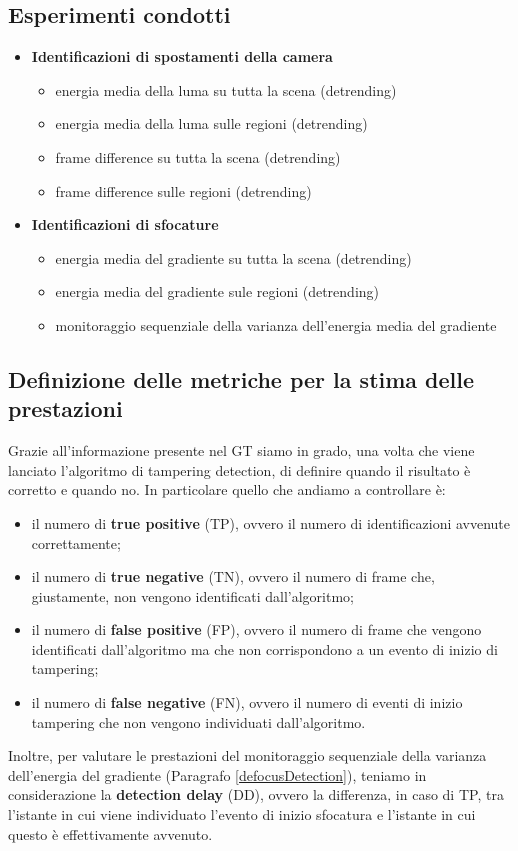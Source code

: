 \subsection{Esperimenti condotti}
\begin{itemize}
	\item \textbf{Identificazioni di spostamenti della camera}
	\begin{itemize}
		\item energia media della luma su tutta la scena (detrending)
		\item energia media della luma sulle regioni (detrending)
		\item frame difference su tutta la scena  (detrending)
		\item frame difference sulle regioni (detrending)
	\end{itemize}
	\item \textbf{Identificazioni di sfocature}
	\begin{itemize}
		\item energia media del gradiente su tutta la scena  (detrending)
		\item energia media del gradiente sule regioni (detrending)
		\item monitoraggio sequenziale della varianza dell'energia media del gradiente
	\end{itemize}
\end{itemize}
\subsection{Definizione delle metriche per la stima delle prestazioni}
Grazie all'informazione presente nel GT siamo in grado, una volta che viene lanciato l'algoritmo di tampering detection, di definire quando il risultato \`e corretto e quando no.
In particolare quello che andiamo a controllare \`e:
\begin{itemize}
	\item il numero di \textbf{true positive} (TP), ovvero il numero di identificazioni avvenute correttamente;
	\item il numero di \textbf{true negative} (TN), ovvero il numero di frame che, giustamente, non vengono identificati dall'algoritmo;
	\item il numero di \textbf{false positive} (FP), ovvero il numero di frame che vengono identificati dall'algoritmo ma che non corrispondono a un evento di inizio di tampering;
	\item il numero di \textbf{false negative} (FN), ovvero il numero di eventi di inizio tampering che non vengono individuati dall'algoritmo.
\end{itemize}
Inoltre, per valutare le prestazioni del monitoraggio sequenziale della varianza dell'energia del gradiente (Paragrafo \ref{defocusDetection}), teniamo in considerazione la \textbf{detection delay} (DD), ovvero la differenza, in caso di TP, tra l'istante in cui viene individuato l'evento di inizio sfocatura e l'istante in cui questo \`e effettivamente avvenuto.\\

